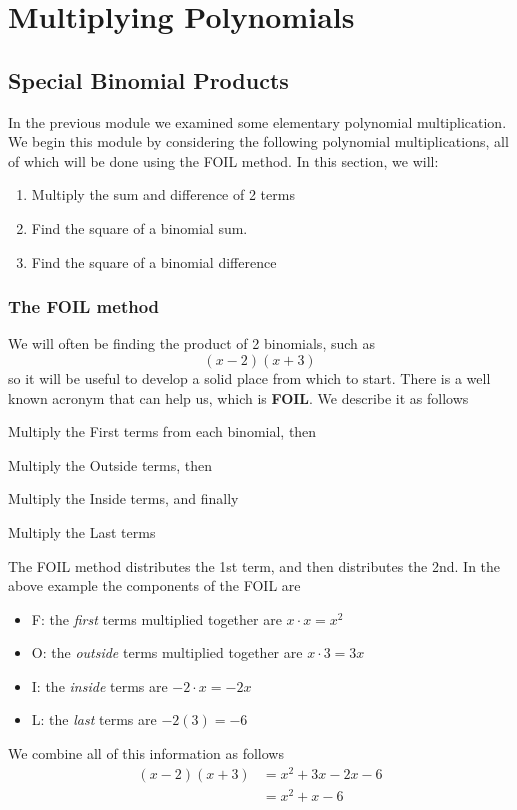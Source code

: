 \chapter{Multiplying Polynomials}
\minitoc
\section{Special Binomial Products}
%
In the previous module we examined some elementary \gls{polynomial} multiplication. We begin
this module by considering the following polynomial multiplications, all of which will
be done using the \gls{FOIL} method. In this section, we will:
\begin{enumerate}
	\item Multiply the sum and difference of 2 terms
	\item Find the square of a \gls{binomial} sum.
	\item Find the square of a binomial difference
\end{enumerate} 

\subsection{The FOIL method}
We will often be finding the product of 2 binomials, such as
\[
	(x-2)(x+3)
\]
so it will be useful to develop a solid place from which to start. There is a well known
acronym that can help us, which is {\bfseries FOIL}. We describe it as follows
\begin{description}
	\item Multiply the  {\color{red}F}irst terms from each binomial, then 
	\item	Multiply the  {\color{green}O}utside terms, then                
	\item	Multiply the  {\color{brown}I}nside terms, and finally          
	\item	Multiply the  {\color{blue}L}ast terms                          
\end{description}
The FOIL method distributes the 1st term, and then distributes the 2nd. In the above example the 
components of the FOIL are
\begin{itemize}
	\item {\color{red}F}: the {\em first} terms multiplied together are $x\cdot x = x^2$
	\item {\color{green}O}: the {\em outside} terms multiplied together are $x\cdot 3 = 3x$
	\item {\color{brown}I}: the {\em inside} terms are $-2\cdot x = -2x$
	\item {\color{blue}L}: the {\em last} terms are $-2(3)=-6$
\end{itemize} 
We combine all of this information as follows
\begin{align*}
	(x-2)(x+3) & =		x^2+3x-2x-6 \\
	           & =		x^2+x-6     
\end{align*} 	

